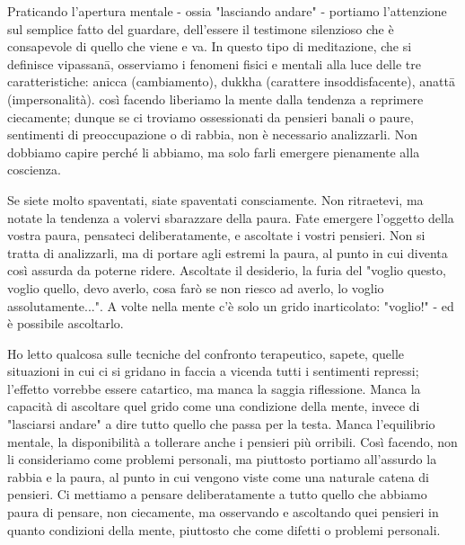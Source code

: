 
Praticando l'apertura mentale - ossia "lasciando andare" - portiamo
l'attenzione sul semplice fatto del guardare, dell'essere il testimone
silenzioso che è consapevole di quello che viene e va. In questo tipo di
meditazione, che si definisce vipassanā, osserviamo i fenomeni fisici e
mentali alla luce delle tre caratteristiche: anicca (cambiamento),
dukkha (carattere insoddisfacente), anattā (impersonalità). così facendo
liberiamo la mente dalla tendenza a reprimere ciecamente; dunque se ci
troviamo ossessionati da pensieri banali o paure, sentimenti di
preoccupazione o di rabbia, non è necessario analizzarli. Non dobbiamo
capire perché li abbiamo, ma solo farli emergere pienamente alla
coscienza.

Se siete molto spaventati, siate spaventati consciamente. Non
ritraetevi, ma notate la tendenza a volervi sbarazzare della paura. Fate
emergere l'oggetto della vostra paura, pensateci deliberatamente, e
ascoltate i vostri pensieri. Non si tratta di analizzarli, ma di portare
agli estremi la paura, al punto in cui diventa così assurda da poterne
ridere. Ascoltate il desiderio, la furia del "voglio questo, voglio
quello, devo averlo, cosa farò se non riesco ad averlo, lo voglio
assolutamente...". A volte nella mente c'è solo un grido inarticolato:
"voglio!" - ed è possibile ascoltarlo.

Ho letto qualcosa sulle tecniche del confronto terapeutico, sapete,
quelle situazioni in cui ci si gridano in faccia a vicenda tutti i
sentimenti repressi; l'effetto vorrebbe essere catartico, ma manca la
saggia riflessione. Manca la capacità di ascoltare quel grido come una
condizione della mente, invece di "lasciarsi andare" a dire tutto quello
che passa per la testa. Manca l'equilibrio mentale, la disponibilità a
tollerare anche i pensieri più orribili. Così facendo, non li
consideriamo come problemi personali, ma piuttosto portiamo all'assurdo
la rabbia e la paura, al punto in cui vengono viste come una naturale
catena di pensieri. Ci mettiamo a pensare deliberatamente a tutto quello
che abbiamo paura di pensare, non ciecamente, ma osservando e ascoltando
quei pensieri in quanto condizioni della mente, piuttosto che come
difetti o problemi personali.

